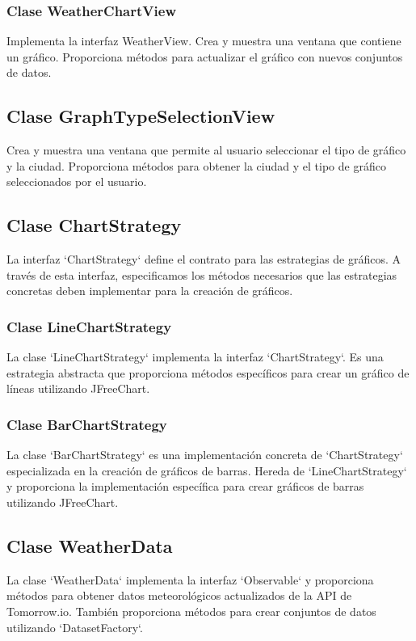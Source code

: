 \documentclass{article}
\begin{document}
\subsubsection{Clase WeatherChartView}
Implementa la interfaz WeatherView. Crea y muestra una ventana que contiene un gráfico. Proporciona métodos para actualizar el gráfico con nuevos conjuntos de datos.

\subsection{Clase GraphTypeSelectionView}
Crea y muestra una ventana que permite al usuario seleccionar el tipo de gráfico y la ciudad. Proporciona métodos para obtener la ciudad y el tipo de gráfico seleccionados por el usuario.

\subsection{Clase ChartStrategy}
La interfaz `ChartStrategy` define el contrato para las estrategias de gráficos. A través de esta interfaz, especificamos los métodos necesarios que las estrategias concretas deben implementar para la creación de gráficos.

\subsubsection{Clase LineChartStrategy}
La clase `LineChartStrategy` implementa la interfaz `ChartStrategy`. Es una estrategia abstracta que proporciona métodos específicos para crear un gráfico de líneas utilizando JFreeChart.

\subsubsection{Clase BarChartStrategy}
La clase `BarChartStrategy` es una implementación concreta de `ChartStrategy` especializada en la creación de gráficos de barras. Hereda de `LineChartStrategy` y proporciona la implementación específica para crear gráficos de barras utilizando JFreeChart.

\subsection{Clase WeatherData}
La clase `WeatherData` implementa la interfaz `Observable` y proporciona métodos para obtener datos meteorológicos actualizados de la API de Tomorrow.io. También proporciona métodos para crear conjuntos de datos utilizando `DatasetFactory`.
\end{document}
